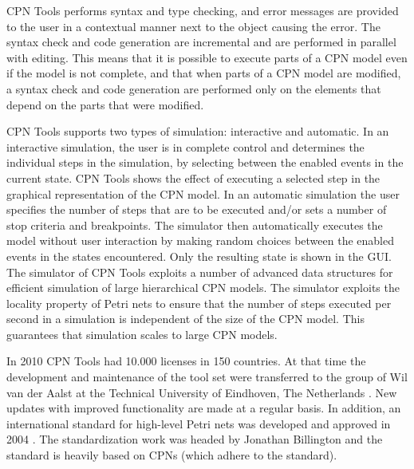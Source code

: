 CPN Tools performs syntax and type checking, and error messages are
provided to the user in a contextual manner next to the object causing
the error. The syntax check and code generation are incremental and
are performed in parallel with editing. This means that it is possible
to execute parts of a CPN model even if the model is not complete, and
that when parts of a CPN model are modified, a syntax check and code
generation are performed only on the elements that depend on the parts
that were modified. 


CPN Tools supports two types of simulation: interactive and
automatic. In an interactive simulation, the user is in complete
control and determines the individual steps in the simulation, by
selecting between the enabled events in the current state. CPN Tools
shows the effect of executing a selected step in the graphical
representation of the CPN model. In an automatic simulation the user
specifies the number of steps that are to be executed and/or sets a
number of stop criteria and breakpoints. The simulator then
automatically executes the model without user interaction by making
random choices between the enabled events in the states
encountered. Only the resulting state is shown in the GUI.  The
simulator of CPN Tools exploits a number of advanced data structures
for efficient simulation of large hierarchical CPN models. The
simulator exploits the locality property of Petri nets to ensure that
the number of steps executed per second in a simulation is independent
of the size of the CPN model. This guarantees that simulation scales
to large CPN models.

In 2010 CPN Tools had 10.000 licenses in 150 countries. At that time
the development and maintenance of the tool set were transferred to
the group of Wil van der Aalst at the Technical University of
Eindhoven, The Netherlands \cite{cpntoolsweb}. New updates with
improved functionality are made at a regular basis.  In addition, an
international standard for high-level Petri nets was developed and
approved in 2004 \cite{hcpnstandard}. The standardization work was
headed by Jonathan Billington and the standard is heavily based on
CPNs (which adhere to the standard).


